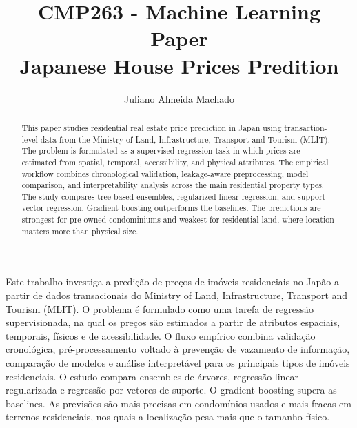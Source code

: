 \documentclass[12pt]{article}
\title{CMP263 - Machine Learning Paper \\ Japanese House Prices Predition}
\author{Juliano Almeida Machado\inst{1}}
\begin{document}
 

\maketitle

\begin{abstract}
This paper studies residential real estate price prediction in Japan using transaction-level data from the Ministry of
Land, Infrastructure, Transport and Tourism (MLIT). The problem is formulated as a supervised regression task in which
prices are estimated from spatial, temporal, accessibility, and physical attributes. The empirical workflow combines
chronological validation, leakage-aware preprocessing, model comparison, and interpretability analysis across the main
residential property types. The study compares tree-based ensembles, regularized linear regression, and support vector
regression. Gradient boosting outperforms the baselines. The predictions are strongest for pre-owned condominiums and
weakest for residential land, where location matters more than physical size.
\end{abstract}
     
\begin{resumo} 
Este trabalho investiga a predição de preços de imóveis residenciais no Japão a partir de dados transacionais do
Ministry of Land, Infrastructure, Transport and Tourism (MLIT). O problema é formulado como uma tarefa de regressão
supervisionada, na qual os preços são estimados a partir de atributos espaciais, temporais, físicos e de acessibilidade.
O fluxo empírico combina validação cronológica, pré-processamento voltado à prevenção de vazamento de informação,
comparação de modelos e análise interpretável para os principais tipos de imóveis residenciais. O estudo compara
ensembles de árvores, regressão linear regularizada e regressão por vetores de suporte. O gradient boosting supera as
baselines. As previsões são mais precisas em condomínios usados e mais fracas em terrenos residenciais, nos quais a
localização pesa mais que o tamanho físico.
\end{resumo}
\end{document}
